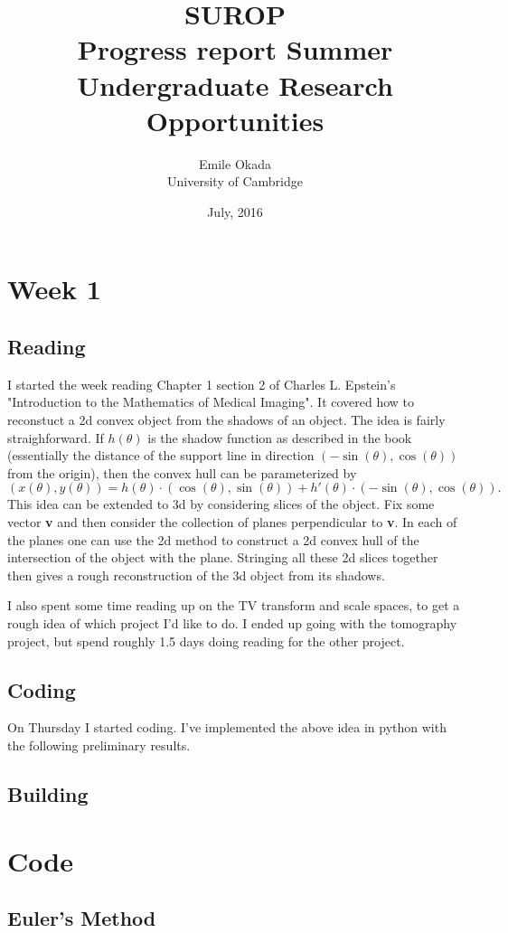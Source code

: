 \documentclass[a4paper]{article}
\begin{document}
\title{
    SUROP \\ Progress report
}
\title{Summer Undergraduate Research Opportunities}
\date{July, 2016}
\author{Emile Okada \\ University of Cambridge}
\maketitle

\newpage

\setcounter{section}{0}
\section{Week 1}
\subsection{Reading}
I started the week reading Chapter 1 section 2 of Charles L. Epstein's "Introduction to the Mathematics of Medical Imaging".
It covered how to reconstuct a 2d convex object from the shadows of an object. 
The idea is fairly straighforward. 
If $h(\theta)$ is the shadow function as described in the book (essentially the distance of the support line in direction $(-\sin(\theta),\cos(\theta))$ from the origin), then the convex hull can be parameterized by
\begin{equation}
    (x(\theta),y(\theta)) = h(\theta)\cdot(\cos(\theta),\sin(\theta))+h'(\theta)\cdot(-\sin(\theta),\cos(\theta)).
\end{equation}
This idea can be extended to 3d by considering slices of the object. 
Fix some vector {\bfseries v} and then consider the collection of planes perpendicular to {\bfseries v}. 
In each of the planes one can use the 2d method to construct a 2d convex hull of the intersection of the object with the plane. 
Stringing all these 2d slices together then gives a rough reconstruction of the 3d object from its shadows.

I also spent some time reading up on the TV transform and scale spaces, to get a rough idea of which project I'd like to do. 
I ended up going with the tomography project, but spend roughly 1.5 days doing reading for the other project.
\subsection{Coding}
On Thursday I started coding. I've implemented the above idea in python with the following preliminary results.
\subsection{Building}

\section{Code}
\subsection{Euler's Method}
\label{alg:euler}

\end{document}
